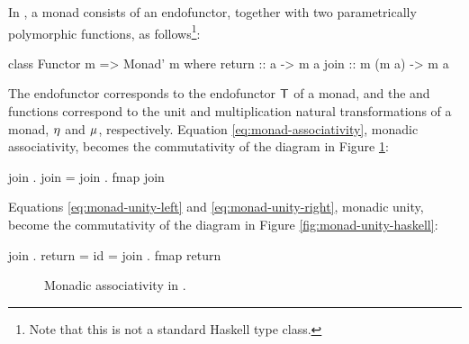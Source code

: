 In \hask, a monad consists of an endofunctor, together with two
parametrically polymorphic functions, as follows\footnote{Note that
  this is not a standard Haskell type class.}:
\begin{codehaskell}
class Functor m => Monad' m where
  return :: a -> m a
  join   :: m (m a) -> m a
\end{codehaskell}
The endofunctor  corresponds to the endofunctor
$\mathsf{T}$ of a monad, and the  and
 functions correspond to the unit and multiplication
natural transformations of a monad, $\eta$ and $\mu$,
respectively. Equation \eqref{eq:monad-associativity}, monadic
associativity, becomes the commutativity of the diagram in Figure
\ref{fig:monad-associativity-haskell}:
\begin{codehaskell}
join . join = join . fmap join
\end{codehaskell}
Equations \eqref{eq:monad-unity-left} and
\eqref{eq:monad-unity-right}, monadic unity, become the commutativity
of the diagram in Figure \ref{fig:monad-unity-haskell}:
\begin{codehaskell}
join . return = id = join . fmap return
\end{codehaskell}

\begin{figure}[htb]
  \begin{center}
  \end{center}
  \caption{Monadic associativity in \hask.}
  \label{fig:monad-associativity-haskell}
\end{figure}

